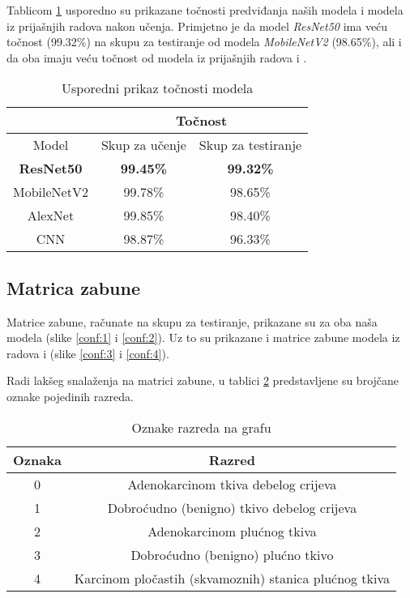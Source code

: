 \documentclass[conference, utf8]{IEEEtran}
\begin{document}
	Tablicom \ref{table:1} usporedno su prikazane točnosti predviđanja naših modela i modela iz prijašnjih radova nakon učenja. 	
	Primjetno je da model \textit{ResNet50} ima veću točnost (99.32\%) na skupu za testiranje od modela \textit{MobileNetV2} (98.65\%), ali i da oba imaju veću točnost od modela iz prijašnjih radova \cite{RAD1} i \cite{RAD2}.
	
	\begin{table}[H]
		\centering
		\caption{Usporedni prikaz točnosti modela}
		\label{table:1}
		\begin{tabular}{ |c|c|c| } 
			\hline
			& \multicolumn{2}{c|}{Točnost} \\
			\hline
			Model & Skup za učenje  & Skup za testiranje \\
			\hline \hline
			\textbf{ResNet50} & \textbf{99.45\%}  & \textbf{99.32\%}  \\
			\hline
			MobileNetV2 & 99.78\%  & 98.65\%  \\
			\hline
			AlexNet\cite{RAD1} & 99.85\%  & 98.40\%  \\
			\hline
			CNN\cite{RAD2} & 98.87\% & 96.33\%  \\
			\hline
		\end{tabular}
	\end{table}
	
	\subsection{Matrica zabune}
	Matrice zabune, računate na skupu za testiranje, prikazane su za oba naša modela (slike \ref{conf:1} i \ref{conf:2}). Uz to su prikazane i matrice zabune modela iz radova \cite{RAD1} i \cite{RAD2} (slike \ref{conf:3} i \ref{conf:4}).
	
	Radi lakšeg snalaženja na matrici zabune, u tablici \ref{table:3} predstavljene su brojčane oznake pojedinih razreda.
	
	\begin{table}[H]
		\centering
		\caption{Oznake razreda na grafu}
		\label{table:3}
		\begin{tabular}{ |c|c| } 
			\hline
			Oznaka & Razred \\
			\hline \hline
			0 & Adenokarcinom tkiva debelog crijeva \\
			\hline
			1 & Dobroćudno (benigno) tkivo debelog crijeva \\
			\hline
			2 & Adenokarcinom plućnog tkiva \\
			\hline
			3 & Dobroćudno (benigno) plućno tkivo \\
			\hline
			4 & Karcinom pločastih (skvamoznih) stanica plućnog tkiva \\
			\hline
		\end{tabular}
	\end{table}
	
\end{document}
